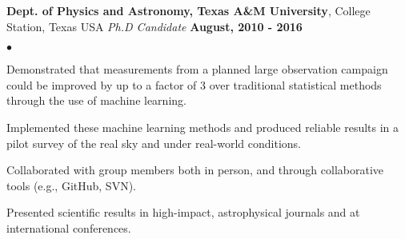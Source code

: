 \documentclass[margin,line, 11pt]{res}
\newenvironment{list2}{
  \begin{list}{$\bullet$}{%
      \setlength{\itemsep}{0in}
      \setlength{\parsep}{0in} \setlength{\parskip}{0in}
      \setlength{\topsep}{0in} \setlength{\partopsep}{0in}
      \setlength{\leftmargin}{0.2in}}}{\end{list}}
\begin{document}
\begin{resume}
\textbf{Dept. of Physics and Astronomy, Texas A\&M University}, College Station, Texas USA\newline
\textit{Ph.D Candidate} \hfill \textbf{August, 2010 - 2016}\newline
    \begin{list2}
    	\vspace*{-5mm}
      \item Demonstrated that measurements from a planned large observation campaign could be improved by up to a factor of 3 over traditional statistical methods through the use of machine learning.
      \item Implemented these machine learning methods and produced reliable results in a pilot survey of the real sky and under real-world conditions.
    	\item Collaborated with group members both in person, and through collaborative tools (e.g., GitHub, SVN).
    	\item Presented scientific results in high-impact, astrophysical journals and at international conferences.
    \end{list2}
\vspace*{-2mm}



\end{resume}
\end{document}
